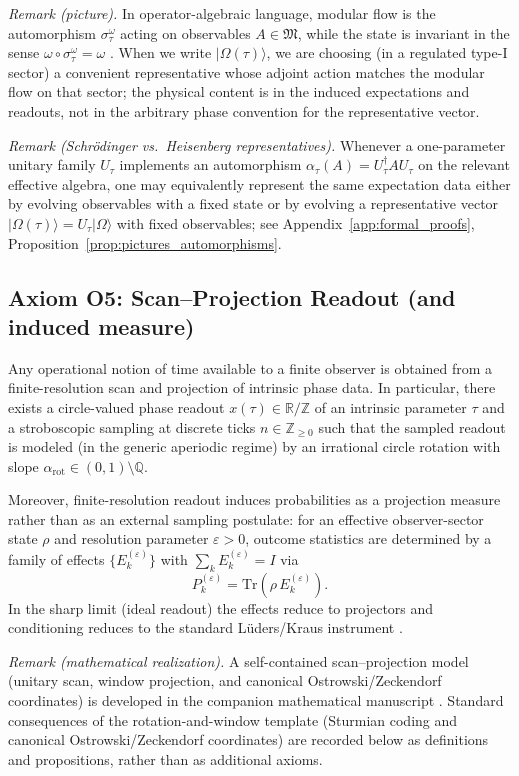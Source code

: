 \noindent\textit{Remark (picture).} In operator-algebraic language, modular flow is the automorphism $\sigma_\tau^\omega$ acting on observables $A\in\mathfrak{M}$, while the state is invariant in the sense $\omega\circ\sigma_\tau^\omega=\omega$ \cite{Takesaki2002}. When we write $|\Omega(\tau)\rangle$, we are choosing (in a regulated type-I sector) a convenient representative whose adjoint action matches the modular flow on that sector; the physical content is in the induced expectations and readouts, not in the arbitrary phase convention for the representative vector.
\par
\noindent\textit{Remark (Schr\"odinger vs.\ Heisenberg representatives).} Whenever a one-parameter unitary family $U_\tau$ implements an automorphism $\alpha_\tau(A)=U_\tau^\dagger A U_\tau$ on the relevant effective algebra, one may equivalently represent the same expectation data either by evolving observables with a fixed state or by evolving a representative vector $|\Omega(\tau)\rangle=U_\tau|\Omega\rangle$ with fixed observables; see Appendix~\ref{app:formal_proofs}, Proposition~\ref{prop:pictures_automorphisms}.

\subsection{Axiom O5: Scan--Projection Readout (and induced measure)}
\begin{axiom}
Any operational notion of time available to a finite observer is obtained from a finite-resolution scan and projection of intrinsic phase data. In particular, there exists a circle-valued phase readout $x(\tau)\in\mathbb{R}/\mathbb{Z}$ of an intrinsic parameter $\tau$ and a stroboscopic sampling at discrete ticks $n\in\mathbb{Z}_{\ge 0}$ such that the sampled readout is modeled (in the generic aperiodic regime) by an irrational circle rotation with slope $\alpha_{\mathrm{rot}}\in(0,1)\setminus\mathbb{Q}$.
\par
Moreover, finite-resolution readout induces probabilities as a projection measure rather than as an external sampling postulate: for an effective observer-sector state $\rho$ and resolution parameter $\varepsilon>0$, outcome statistics are determined by a family of effects $\{E_k^{(\varepsilon)}\}$ with $\sum_k E_k^{(\varepsilon)}=I$ via
\begin{equation}
    P_k^{(\varepsilon)}=\mathrm{Tr}\!\left(\rho\,E_k^{(\varepsilon)}\right).
\end{equation}
In the sharp limit (ideal readout) the effects reduce to projectors and conditioning reduces to the standard L{\"u}ders/Kraus instrument \cite{Kraus1983,NielsenChuang2000}.
\end{axiom}
\noindent\textit{Remark (mathematical realization).} A self-contained scan--projection model (unitary scan, window projection, and canonical Ostrowski/Zeckendorf coordinates) is developed in the companion mathematical manuscript \cite{Ma2025HPA}. Standard consequences of the rotation-and-window template (Sturmian coding and canonical Ostrowski/Zeckendorf coordinates) are recorded below as definitions and propositions, rather than as additional axioms.

